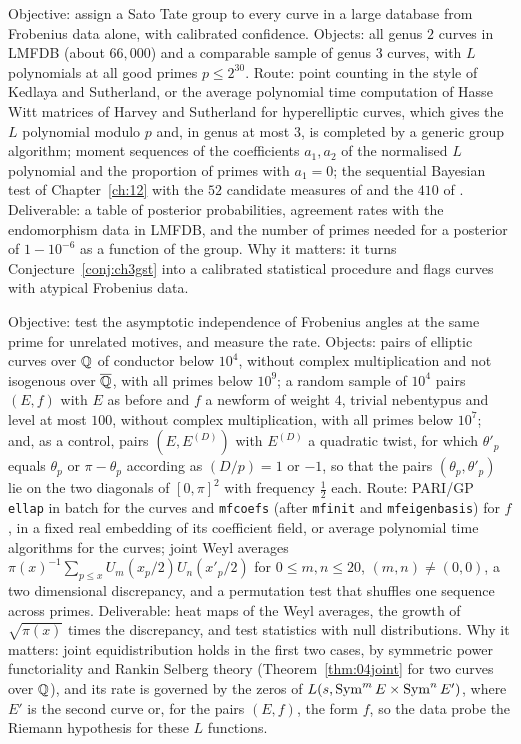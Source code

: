 \begin{compproblem}
Objective: assign a Sato Tate group to every curve in a large database from Frobenius data alone, with calibrated confidence. Objects: all genus $2$ curves in LMFDB (about $66{,}000$) and a comparable sample of genus $3$ curves, with $L$ polynomials at all good primes $p\le2^{30}$. Route: point counting in the style of Kedlaya and Sutherland, or the average polynomial time computation of Hasse Witt matrices of Harvey and Sutherland \cite{harveysutherland2014} for hyperelliptic curves, which gives the $L$ polynomial modulo $p$ and, in genus at most $3$, is completed by a generic group algorithm; moment sequences of the coefficients $a_1,a_2$ of the normalised $L$ polynomial and the proportion of primes with $a_1=0$; the sequential Bayesian test of Chapter~\ref{ch:12} with the $52$ candidate measures of \cite{fkrs2012} and the $410$ of \cite{fks2021}. Deliverable: a table of posterior probabilities, agreement rates with the endomorphism data in LMFDB, and the number of primes needed for a posterior of $1-10^{-6}$ as a function of the group. Why it matters: it turns Conjecture~\ref{conj:ch3gst} into a calibrated statistical procedure and flags curves with atypical Frobenius data.
\end{compproblem}

\begin{compproblem}
Objective: test the asymptotic independence of Frobenius angles at the same prime for unrelated motives, and measure the rate. Objects: pairs of elliptic curves over $\mathbb{Q}$ of conductor below $10^4$, without complex multiplication and not isogenous over $\overline{\mathbb{Q}}$, with all primes below $10^9$; a random sample of $10^4$ pairs $(E,f)$ with $E$ as before and $f$ a newform of weight $4$, trivial nebentypus and level at most $100$, without complex multiplication, with all primes below $10^7$; and, as a control, pairs $(E,E^{(D)})$ with $E^{(D)}$ a quadratic twist, for which $\theta'_p$ equals $\theta_p$ or $\pi-\theta_p$ according as $(D/p)=1$ or $-1$, so that the pairs $(\theta_p,\theta'_p)$ lie on the two diagonals of $[0,\pi]^2$ with frequency $\tfrac12$ each. Route: PARI/GP \texttt{ellap} in batch for the curves and \texttt{mfcoefs} (after \texttt{mfinit} and \texttt{mfeigenbasis}) for $f$, in a fixed real embedding of its coefficient field, or average polynomial time algorithms for the curves; joint Weyl averages $\pi(x)^{-1}\sum_{p\le x}U_m(x_p/2)U_n(x'_p/2)$ for $0\le m,n\le20$, $(m,n)\ne(0,0)$, a two dimensional discrepancy, and a permutation test that shuffles one sequence across primes. Deliverable: heat maps of the Weyl averages, the growth of $\sqrt{\pi(x)}$ times the discrepancy, and test statistics with null distributions. Why it matters: joint equidistribution holds in the first two cases, by symmetric power functoriality and Rankin Selberg theory (Theorem~\ref{thm:04joint} for two curves over $\mathbb{Q}$), and its rate is governed by the zeros of $L(s,\operatorname{Sym}^mE\times\operatorname{Sym}^nE')$, where $E'$ is the second curve or, for the pairs $(E,f)$, the form $f$, so the data probe the Riemann hypothesis for these $L$ functions.
\end{compproblem}
